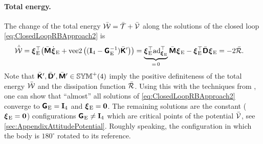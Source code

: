 \paragraph{Total energy.}
The change of the total energy $\bar{\mathcal{W}} = \bar{\mathcal{T}} + \bar{\mathcal{V}}$ along the solutions of the closed loop \eqref{eq:ClosedLoopRBApproach2} is 
\begin{align}\label{eq:CtrlTotalEnergyRBAppraoch2}
 \totalEnergyCd 
 &= \bodyVelE{}{}^\top \big( \bodyInertiaMatC{}{} \bodyVelEd{}{} + \veeTwoOp\big( (\idMat[4] - \bodyHomoCoordE{}{}^{-1}) \bodyStiffMatCp{}{} \big) \big)
 = \underbrace{\bodyVelE{}{}^\top \ad{\bodyVelE{}{}}^\top}_{=\,0} \bodyInertiaMatC{}{} \bodyVelE{}{} - \bodyVelE{}{}^\top \bodyDissMatC{}{} \bodyVelE{}{}
 = -2\dissFktC.
\end{align}
Note that $\bodyStiffMatCp{}{}, \bodyDissMatCp{}{}, \bodyInertiaMatCp{}{} \in \SymMatP(4)$ imply the positive definiteness of the total energy $\bar{\mathcal{W}}$ and the dissipation function $\bar{\mathcal{R}}$.
Using this with the techniques from \cite{Koditschek:TotalEnergy}, one can show that ``almost'' all solutions of \eqref{eq:ClosedLoopRBApproach2} converge to $\bodyHomoCoordE{}{} = \idMat[4]$ and $\bodyVelE{}{} = \tuple{0}$.
The remaining solutions are the constant ($\bodyVelE{}{} = \tuple{0}$) configurations $\bodyHomoCoordE{}{} \neq \idMat[4]$ which are critical points of the potential $\bar{\mathcal{V}}$, see \autoref{sec:AppendixAttitudePotential}.
Roughly speaking, the configuration in which the body is $180^\circ$ rotated to its reference.


